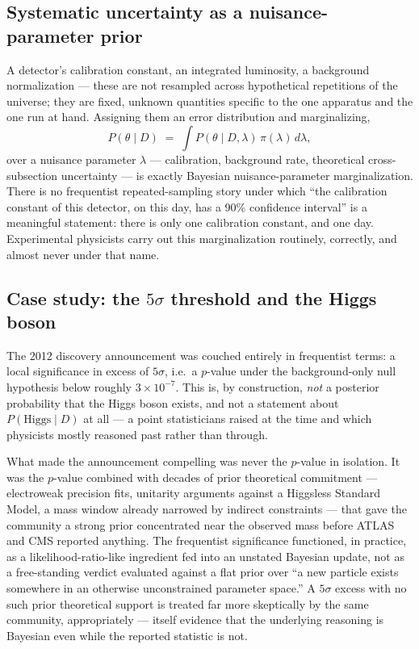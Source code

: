 \subsection{Systematic uncertainty as a nuisance-parameter prior}

A detector's calibration constant, an integrated luminosity, a background
normalization --- these are not resampled across hypothetical repetitions of
the universe; they are fixed, unknown quantities specific to the one apparatus
and the one run at hand. Assigning them an error distribution and
marginalizing,
\begin{equation}
P(\theta \mid D) \;=\; \int P(\theta \mid D, \lambda)\,\pi(\lambda)\, d\lambda,
\end{equation}
over a nuisance parameter $\lambda$ --- calibration, background rate,
theoretical cross-subsection uncertainty --- is exactly Bayesian
nuisance-parameter marginalization. There is no frequentist repeated-sampling
story under which ``the calibration constant of this detector, on this day, has
a 90\% confidence interval'' is a meaningful statement: there is only one
calibration constant, and one day. Experimental physicists carry out this
marginalization routinely, correctly, and almost never under that name.

\subsection{Case study: the $5\sigma$ threshold and the Higgs boson}

The 2012 discovery announcement was couched entirely in frequentist terms: a
local significance in excess of $5\sigma$, i.e.\ a $p$-value under the
background-only null hypothesis below roughly $3\times10^{-7}$. This is, by
construction, \emph{not} a posterior probability that the Higgs boson exists,
and not a statement about $P(\text{Higgs} \mid D)$ at all --- a point
statisticians raised at the time and which physicists mostly reasoned past
rather than through.

\begin{remark}
What made the announcement compelling was never the $p$-value in isolation. It
    was the $p$-value combined with decades of prior theoretical commitment ---
    electroweak precision fits, unitarity arguments against a Higgsless
    Standard Model, a mass window already narrowed by indirect constraints ---
    that gave the community a strong prior concentrated near the observed mass
    before ATLAS and CMS reported anything. The frequentist significance
    functioned, in practice, as a likelihood-ratio-like ingredient fed into an
    unstated Bayesian update, not as a free-standing verdict evaluated against
    a flat prior over ``a new particle exists somewhere in an otherwise
    unconstrained parameter space.'' A $5\sigma$ excess with no such prior
    theoretical support is treated far more skeptically by the same community,
    appropriately --- itself evidence that the underlying reasoning is Bayesian
    even while the reported statistic is not.
\end{remark}

